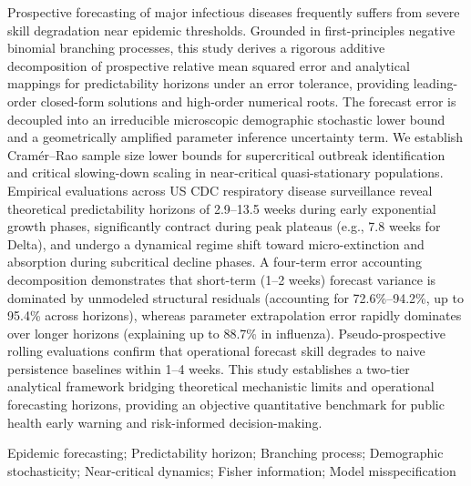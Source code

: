 \documentclass[11pt,a4paper]{article}
\theoremstyle{plain}
\theoremstyle{definition}
\begin{document}
 Prospective forecasting of major infectious diseases frequently suffers from severe skill degradation near epidemic thresholds. Grounded in first-principles negative binomial branching processes, this study derives a rigorous additive decomposition of prospective relative mean squared error and analytical mappings for predictability horizons under an error tolerance, providing leading-order closed-form solutions and high-order numerical roots. The forecast error is decoupled into an irreducible microscopic demographic stochastic lower bound and a geometrically amplified parameter inference uncertainty term. We establish Cram\'er--Rao sample size lower bounds for supercritical outbreak identification and critical slowing-down scaling in near-critical quasi-stationary populations. Empirical evaluations across US CDC respiratory disease surveillance reveal theoretical predictability horizons of 2.9--13.5 weeks during early exponential growth phases, significantly contract during peak plateaus (e.g., 7.8 weeks for Delta), and undergo a dynamical regime shift toward micro-extinction and absorption during subcritical decline phases. A four-term error accounting decomposition demonstrates that short-term (1--2 weeks) forecast variance is dominated by unmodeled structural residuals (accounting for 72.6\%--94.2\%, up to 95.4\% across horizons), whereas parameter extrapolation error rapidly dominates over longer horizons (explaining up to 88.7\% in influenza). Pseudo-prospective rolling evaluations confirm that operational forecast skill degrades to naive persistence baselines within 1--4 weeks. This study establishes a two-tier analytical framework bridging theoretical mechanistic limits and operational forecasting horizons, providing an objective quantitative benchmark for public health early warning and risk-informed decision-making.

 Epidemic forecasting; Predictability horizon; Branching process; Demographic stochasticity; Near-critical dynamics; Fisher information; Model misspecification

\vspace{1.5em}


\end{document}
